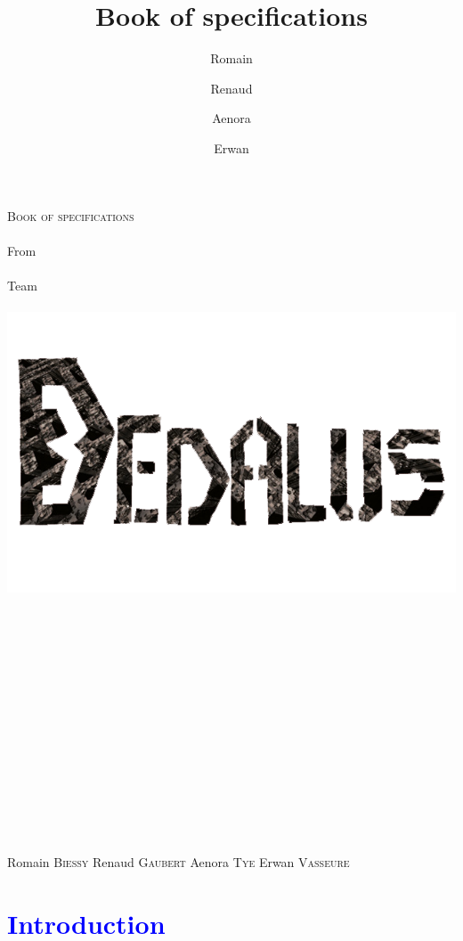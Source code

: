 \documentclass[article]{report} %
\title {Book of specifications}
\author {Romain\and Renaud\and Aenora\and Erwan}
\date {}
\begin{document}
		\thispagestyle{empty}
  			\begin{titlepage} 
						\vspace*{1cm} 
  					\begin{center} 
  							{\huge{\textsc{Book of specifications} \\ ~ \\{\large From}\\ ~\\ Team \\  ~ \\ }}
	  						\includegraphics[width = 14cm]{Images/Dedalus.png}
							\\ ~ \\ ~ \\ ~ \\ ~ \\ ~ \\ ~ \\ ~ \\ ~ \\ ~ \\ ~ \\ ~ \\ ~ \\ ~ \\ ~ 
						\end{center}
  					\hfill {\large Romain \textsc{Biessy}}
  					\hfill {\large Renaud \textsc{Gaubert}}
  					\hfill {\large Aenora \textsc{Tye}}
  					\hfill {\large Erwan  \textsc{Vasseure}}
  			\end{titlepage} 

  	\tableofcontents
  			\newpage
				\chapter{\textcolor{blue}{Introduction}}
\end{document}
